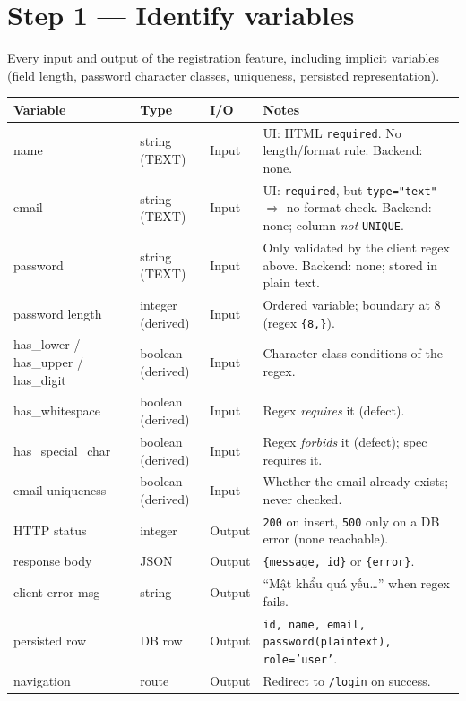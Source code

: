 \documentclass[11pt,a4paper]{article}
\begin{document}
\section{Step 1 --- Identify variables}
\label{sec:vars}
Every input and output of the registration feature, including implicit variables (field
length, password character classes, uniqueness, persisted representation).

\begin{center}
\begin{tabular}{L{2.6cm} L{2.3cm} L{1.7cm} L{7.8cm}}
\toprule
\textbf{Variable} & \textbf{Type} & \textbf{I/O} & \textbf{Notes} \\
\midrule
name       & string (TEXT)  & Input  & UI: HTML \texttt{required}. No length/format rule. Backend: none. \\
email      & string (TEXT)  & Input  & UI: \texttt{required}, but \texttt{type="text"} $\Rightarrow$ no format check. Backend: none; column \emph{not} \texttt{UNIQUE}. \\
password   & string (TEXT)  & Input  & Only validated by the client regex above. Backend: none; stored in plain text. \\
password length     & integer (derived) & Input & Ordered variable; boundary at 8 (regex \verb|{8,}|). \\
has\_lower / has\_upper / has\_digit & boolean (derived) & Input & Character-class conditions of the regex. \\
has\_whitespace     & boolean (derived) & Input & Regex \emph{requires} it (defect). \\
has\_special\_char  & boolean (derived) & Input & Regex \emph{forbids} it (defect); spec requires it. \\
email uniqueness    & boolean (derived) & Input & Whether the email already exists; never checked. \\
\midrule
HTTP status         & integer & Output & \texttt{200} on insert, \texttt{500} only on a DB error (none reachable). \\
response body       & JSON    & Output & \verb|{message, id}| or \verb|{error}|. \\
client error msg    & string  & Output & ``Mật khẩu qu\'á yếu\ldots'' when regex fails. \\
persisted row       & DB row  & Output & \texttt{id, name, email, password(plaintext), role='user'}. \\
navigation          & route   & Output & Redirect to \texttt{/login} on success. \\
\bottomrule
\end{tabular}
\end{center}
\end{document}
